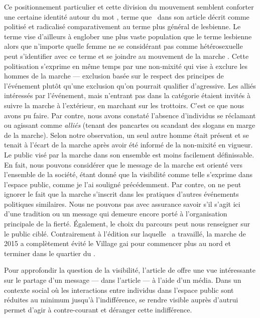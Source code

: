 Ce positionnement particulier et cette division du mouvement semblent conforter une certaine identité autour du mot \dyke{}, terme que~\citet{Podmore2015a} dans son article  décrit comme politisé et radicalisé comparativement au terme plus général de lesbienne.
Le terme \dyke{} vise d'ailleurs à englober une plus vaste population que le terme lesbienne alors que n'importe quelle femme ne se considérant pas comme hétérosexuelle peut s'identifier avec ce terme et se joindre au mouvement de la marche \dyke{}.
Cette politisation s'exprime en même temps par une non-mixité qui vise à exclure les hommes de la marche --- exclusion basée sur le respect des principes de l'événement plutôt qu'une exclusion qu'on pourrait qualifier d'agressive.
Les alliés intéressés par l'événement, mais n'entrant pas dans la catégorie \dyke{} étaient invités à suivre la marche à l'extérieur, en marchant sur les trottoirs.
C'est ce que nous avons pu faire.
Par contre, nous avons constaté l'absence d'individus se réclamant ou agissant comme \emph{alliés} (tenant des pancartes ou scandant des slogans en marge de la marche).
Selon notre observation, un seul autre homme était présent et se tenait à l'écart de la marche après avoir été informé de la non-mixité en vigueur.
Le public visé par la marche dans son ensemble est moins facilement définissable.
En fait, nous pouvons considérer que le message de la marche est orienté vers l'ensemble de la société, étant donné que la visibilité comme telle s'exprime dans l'espace public, comme je l'ai souligné précédemment.
Par contre, on ne peut ignorer le fait que la marche s'inscrit dans les pratiques d'autres événements politiques similaires.
Nous ne pouvons pas avec assurance savoir s'il s'agit ici d'une tradition ou un message qui demeure encore porté à l'organisation principale de la fierté.
Également, le choix du parcours peut nous renseigner sur le public ciblé.
Contrairement à l'édition sur laquelle~\citet{Podmore2015a} a travaillé, la marche de 2015 a complètement évité le Village gai pour commencer plus au nord et terminer dans le quartier du .

Pour approfondir la question de la visibilité, l'article de \citet{Frosh2006}  offre une vue intéressante sur le partage d'un message ---  dans l'article --- à l'aide d'un média.
Dans un contexte social où les interactions entre individus dans l'espace public sont réduites au minimum jusqu'à l'indifférence, se rendre visible auprès d'autrui permet d'agir à contre-courant et déranger cette indifférence.

